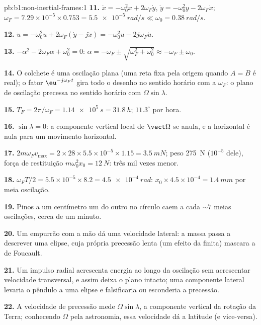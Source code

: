 \begin{solution}{pb:b1:non-inertial-frames:1}
\textbf{11.} $\ddot x = -\omega_0^2x + 2\omega_F\dot y$, $\ddot y = -\omega_0^2y -
2\omega_F\dot x$; $\omega_F = 7.29\times10^{-5} \times 0.753 = \qty{5.5e-5}{rad/s}
\ll \omega_0 = \qty{0.38}{rad/s}$.

\textbf{12.} $\ddot u = -\omega_0^2u + 2\omega_F(\dot y - j\dot x) = -\omega_0^2u -
2j\omega_F\dot u$.

\textbf{13.} $-\alpha^2 - 2\omega_F\alpha + \omega_0^2 = 0$: $\alpha = -\omega_F \pm
\sqrt{\omega_F^2 + \omega_0^2} \approx -\omega_F \pm \omega_0$.

\textbf{14.} O colchete é uma oscilação plana (uma reta fixa pela origem
quando $A = B$ é real); o fator $\eu^{-j\omega_Ft}$ gira todo o desenho no
sentido horário com a  $\omega_F$: o plano de oscilação
precessa no sentido horário com $\Omega\sin\lambda$.

\textbf{15.} $T_F = 2\pi/\omega_F = \qty{1.14e5}{s} = \qty{31.8}{h}$; $11.3^\circ$
por hora.

\textbf{16.} $\sin\lambda = 0$: a componente vertical local de $\vect\Omega$
se anula, e a  horizontal é nula para um movimento horizontal.

\textbf{17.} $2m\omega_Fv_{\max} = 2 \times 28 \times 5.5\times10^{-5} \times 1.15 =
\qty{3.5}{mN}$; peso \qty{275}{N} ($10^{-5}$ dele), força de restituição
$m\omega_0^2x_0 = \qty{12}{N}$: três mil vezes menor.

\textbf{18.} $\omega_FT/2 = 5.5\times10^{-5} \times 8.2 = \qty{4.5e-4}{rad}$:
$x_0 \times 4.5\times10^{-4} = \qty{1.4}{mm}$ por meia oscilação.

\textbf{19.} Pinos a um centímetro um do outro no círculo caem a cada
$\sim 7$ meias oscilações, cerca de um minuto.

\textbf{20.} Um empurrão com a mão dá uma velocidade lateral: a massa passa
a descrever uma elipse, cuja própria precessão lenta (um efeito da
 finita) mascara a de Foucault.

\textbf{21.} Um impulso radial acrescenta energia ao longo da oscilação sem
acrescentar velocidade transversal, e assim deixa o plano intacto; uma
componente lateral levaria o pêndulo a uma elipse e falsificaria ou
esconderia a precessão.

\textbf{22.} A velocidade de precessão mede $\Omega\sin\lambda$, a componente
vertical da rotação da Terra; conhecendo $\Omega$ pela astronomia, essa
velocidade dá a latitude (e vice-versa).


\end{solution}
